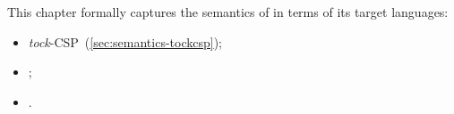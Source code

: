 
\newcommand{\tlang}[1]{\textcolor{TColor}{\boxed{#1}}}
\newcommand{\olang}[1]{\boxed{\textcolor{ZedColor}{#1}}}

\newcommand{\tockcsp}{\emph{tock}-CSP}
\newcommand{\cspm}{CSP\(_\text{M}\)}

\newcommand{\defeq}{\mathbin{\overset{\text{def}}=}}
\newcommand{\interrupt}{\mathbin{\triangle}}
\newcommand{\cspnsop}{\mathbin{\!:\!:\!}}
\newcommand{\cspkw}[1]{\operatorname{\mathbf{#1}}}
\newcommand{\runproc}[1]{\cspkw{Run}\left(#1\right)}
\newcommand{\events}{\cspkw{Events}}

\newcommand{\exprsema}[2]{\sema{#1}{expr}_{(#2)}}

\newcommand{\sema}[2]{\llbracket #1 \rrbracket^{\mathsf{#2}}}
\newcommand{\pkgsema}[1]{\sema{#1}{pkg}}
\newcommand{\cspsema}[1]{\sema{#1}{csp}}
\newcommand{\stepsema}[1]{\sema{#1}{step}}
\newcommand{\gapsema}[2]{\sema{#1}{gap}_{(#2)}}
\newcommand{\actsema}[1]{\sema{#1}{act}}
\newcommand{\mspecsema}[2]{\sema{#1}{mspec}_{\text{#2}}}
\newcommand{\pmspecsema}[1]{\mspecsema{#1}{prefix}}
\newcommand{\emspecsema}[1]{\mspecsema{#1}{events}}
\newcommand{\arglistsema}[2]{\sema{#1}{args}_{(#2)}}
\newcommand{\loopsema}[1]{\sema{#1}{loop}}
\newcommand{\msgsetsema}[1]{\sema{#1}{mset}}
\newcommand{\seqsema}[1]{\sema{#1}{seq}}
\newcommand{\sseqsema}[1]{\sema{#1}{sseq}}
\newcommand{\asstsema}[1]{\sema{#1}{asst}}

\newcommand{\targetsema}[2]{\sema{#1}{target}_{(#2)}}

\newcommand{\funcname}[1]{\ensuremath{\mathsf{#1}}}
\newcommand{\eventsOf}[1]{\funcname{events}(#1)}
\newcommand{\seqnameOf}[1]{\funcname{seqName}(#1)}
\newcommand{\ctargetnameOf}[1]{\funcname{ctargetName}(#1)}
\newcommand{\otargetnameOf}[1]{\funcname{otargetName}(#1)}

\newcommand{\field}[2]{#1.\funcname{#2}}

This chapter formally captures the semantics of \langname{} in terms of its
target languages:

\begin{itemize}
\item
	\tockcsp~(\cref{sec:semantics-tockcsp});
\item
	;
\item
	.
\end{itemize}

